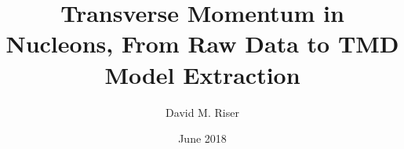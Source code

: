 \title{Transverse Momentum in Nucleons, From Raw Data to TMD Model Extraction}
\author{David M. Riser}
\date{June 2018}

